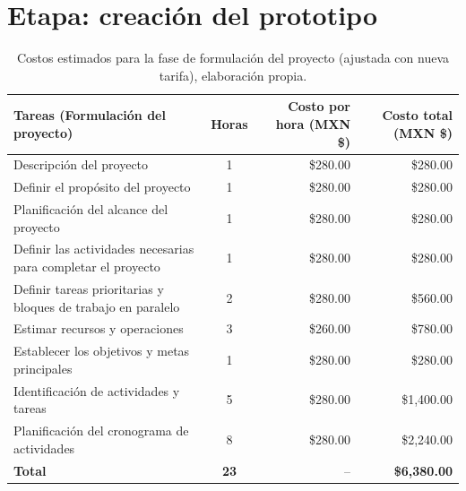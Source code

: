 \section{Etapa: creación del prototipo}
\begin{table}[H]
	\centering
	\renewcommand{\arraystretch}{1.6}
	\setlength{\tabcolsep}{10pt}
	\Huge
	\begin{adjustbox}{max width=\textwidth}
		\begin{tabular}{|p{9.5cm}|c|r|r|}
			\hline
			\textbf{Tareas (Formulación del proyecto)} & \textbf{Horas} & \textbf{Costo por hora (MXN \$)} & \textbf{Costo total (MXN \$)} \\ \hline
			Descripción del proyecto & 1 & \$280.00 & \$280.00 \\ \hline
			Definir el propósito del proyecto & 1 & \$280.00 & \$280.00 \\ \hline
			Planificación del alcance del proyecto & 1 & \$280.00 & \$280.00 \\ \hline
			Definir las actividades necesarias para completar el proyecto & 1 & \$280.00 & \$280.00 \\ \hline
			Definir tareas prioritarias y bloques de trabajo en paralelo & 2 & \$280.00 & \$560.00 \\ \hline
			Estimar recursos y operaciones & 3 & \$260.00 & \$780.00 \\ \hline
			Establecer los objetivos y metas principales & 1 & \$280.00 & \$280.00 \\ \hline
			Identificación de actividades y tareas & 5 & \$280.00 & \$1,400.00 \\ \hline
			Planificación del cronograma de actividades & 8 & \$280.00 & \$2,240.00 \\ \hline
			\textbf{Total} & \textbf{23} & -- & \textbf{\$6,380.00} \\ \hline
		\end{tabular}
	\end{adjustbox}
	\caption[Costos estimados para la fase de formulación del proyecto (ajustada con nueva tarifa)]{Costos estimados para la fase de formulación del proyecto (ajustada con nueva tarifa), elaboración propia.} 	
	\label{tab:costos_formulacion_tarifa280}
\end{table}

